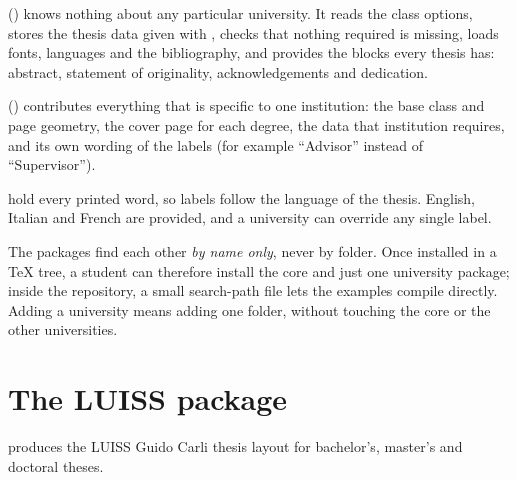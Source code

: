 \documentclass[11pt,a4paper]{article}
\begin{document}
\begin{description}[leftmargin=0pt, labelindent=0pt, itemsep=4pt]
  \item[The core class] () knows nothing about any
    particular university. It reads the class options, stores the thesis
    data given with , checks that nothing required is
    missing, loads fonts, languages and the bibliography, and provides the
    blocks every thesis has: abstract, statement of originality,
    acknowledgements and dedication.
  \item[A university package] ()
    contributes everything that is specific to one institution: the base
    class and page geometry, the cover page for each degree, the data that
    institution requires, and its own wording of the labels (for example
    ``Advisor'' instead of ``Supervisor'').
  \item[Language files] hold every printed word, so labels follow the
    language of the thesis. English, Italian and French are provided, and
    a university can override any single label.
\end{description}

The packages find each other \emph{by name only}, never by folder. Once
installed in a \TeX{} tree, a student can therefore install the core and
just one university package; inside the repository, a small search-path
file lets the examples compile directly. Adding a university means adding
one folder, without touching the core or the other universities.

\section{The LUISS package}

 produces the LUISS Guido Carli thesis layout for
bachelor's, master's and doctoral theses.

\begin{center}
  \hfill
  \hfill
\end{center}
\end{document}
